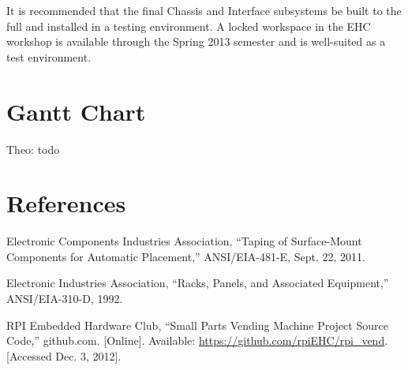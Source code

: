 \documentclass[12pt,draft,oneside]{article}
\begin{document}
It is recommended that the final Chassis and Interface subsystems be built to the full  and installed in a testing environment. A locked workspace in the EHC workshop is available through the Spring 2013 semester and is well-suited as a test environment.

\appendix

\section{Gantt Chart}
\label{ref:gantt}
Theo: todo

\section{References}
\label{ref:refs}



\begin{thebibliography}{1}


   Electronic Components Industries Association, ``Taping of Surface-Mount Components for Automatic Placement,'' ANSI/EIA-481-E, Sept. 22, 2011.

   Electronic Industries Association, ``Racks, Panels, and Associated Equipment,'' ANSI/EIA-310-D, 1992.

   RPI Embedded Hardware Club, ``Small Parts Vending Machine Project Source Code,'' github.com. [Online]. Available: \url{https://github.com/rpiEHC/rpi_vend}. [Accessed Dec. 3, 2012].

\end{thebibliography}
\end{document}
